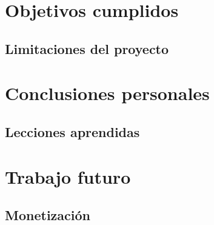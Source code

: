 
\section{Objetivos cumplidos}


\subsection{Limitaciones del proyecto}

\section{Conclusiones personales}

\subsection{Lecciones aprendidas}

\section{Trabajo futuro}

\subsection{Monetización}
